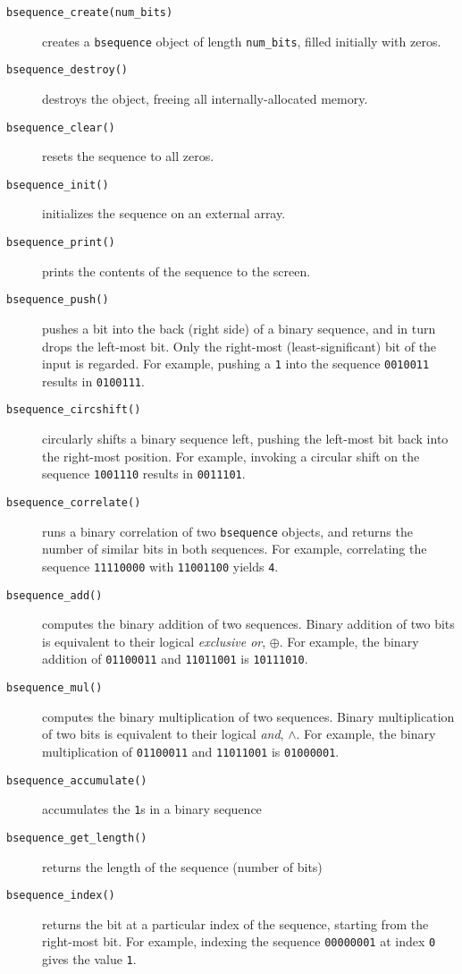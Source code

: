\begin{description}
\item[{\tt bsequence\_create(num\_bits)}]
    creates a {\tt bsequence} object of length {\tt num\_bits}, filled
    initially with zeros.
\item[{\tt bsequence\_destroy()}]
    destroys the object, freeing all internally-allocated memory.
\item[{\tt bsequence\_clear()}]
    resets the sequence to all zeros.
\item[{\tt bsequence\_init()}]
    initializes the sequence on an external array.
\item[{\tt bsequence\_print()}]
    prints the contents of the sequence to the screen.
\item[{\tt bsequence\_push()}]
    pushes a bit into the back (right side) of a binary sequence, and in turn
    drops the left-most bit.
    Only the right-most (least-significant) bit of the input is regarded.
    For example, pushing a {\tt 1} into the sequence {\tt 0010011} results in
    {\tt 0100111}.
\item[{\tt bsequence\_circshift()}]
    circularly shifts a binary sequence left, pushing the left-most bit back
    into the right-most position.
    For example, invoking a circular shift on the sequence {\tt 1001110}
    results in {\tt 0011101}.
\item[{\tt bsequence\_correlate()}]
    runs a binary correlation of two {\tt bsequence} objects, and returns the
    number of similar bits in both sequences.
    For example, correlating the sequence {\tt 11110000} with {\tt 11001100}
    yields {\tt 4}.
\item[{\tt bsequence\_add()}]
    computes the binary addition of two sequences.
    Binary addition of two bits is equivalent to their logical
    {\em exclusive or}, $\oplus$.
    For example, the binary addition of
    {\tt 01100011} and
    {\tt 11011001} is
    {\tt 10111010}.
\item[{\tt bsequence\_mul()}]
    computes the binary multiplication of two sequences.
    Binary multiplication of two bits is equivalent to their logical
    {\em and}, $\land$.
    For example, the binary multiplication of
    {\tt 01100011} and
    {\tt 11011001} is
    {\tt 01000001}.
\item[{\tt bsequence\_accumulate()}]
    accumulates the {\tt 1}s in a binary sequence
\item[{\tt bsequence\_get\_length()}]
    returns the length of the sequence (number of bits)
\item[{\tt bsequence\_index()}]
    returns the bit at a particular index of the sequence, starting from the
    right-most bit.
    For example, indexing the sequence {\tt 00000001} at index {\tt 0} gives
    the value {\tt 1}.
\end{description}


